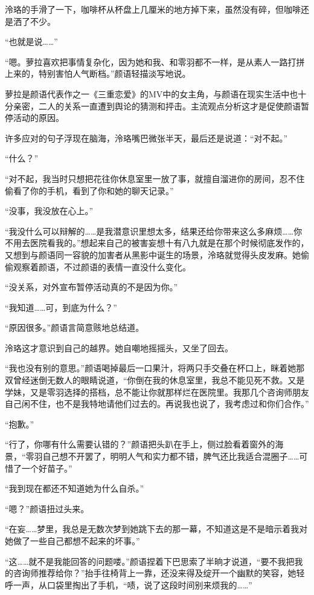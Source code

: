 \documentclass[UTF8, scheme = chinese, openany]{ctexbook}
\begin{document}
泠珞的手滑了一下，咖啡杯从杯盘上几厘米的地方掉下来，虽然没有碎，但咖啡还是洒了不少。

“也就是说……”

“嗯。萝拉喜欢把事情复杂化，因为她和我、和零羽都不一样，是从素人一路打拼上来的，特别害怕人气断档。”颜语轻描淡写地说。

萝拉是颜语代表作之一《三重恋爱》的MV中的女主角，与颜语在现实生活中也十分亲密，二人的关系一直遭到舆论的猜测和抨击。主流观点分析这才是促使颜语暂停活动的原因。

许多应对的句子浮现在脑海，泠珞嘴巴微张半天，最后还是说道：“对不起。”

“什么？”

“对不起，我当时只想把花往你休息室里一放了事，就擅自溜进你的房间，忍不住偷看了你的手机，看到了你和她的聊天记录。”

“没事，我没放在心上。”

“我没什么可以辩解的……是我潜意识里想太多，结果还给你带来这么多麻烦……你不用去医院看我的。”想起来自己的被害妄想十有八九就是在那个时候彻底发作的，又想到与颜语同一容貌的加害者从黑影中诞生的场景，泠珞就觉得头皮发麻。她偷偷观察着颜语，不过颜语的表情一直没什么变化。

“没关系，对外宣布暂停活动真的不是因为你。”

“我知道……可，到底为什么？”

“原因很多。”颜语言简意赅地总结道。

泠珞这才意识到自己的越界。她自嘲地摇摇头，又坐了回去。

“我也没有别的意思。”颜语喝掉最后一口果汁，将两只手交叠在杯口上，眯着她那双曾经迷倒无数人的眼睛说道，“你倒在我的休息室里，我总不能见死不救。又是学妹，又是零羽选择的搭档，总不能让你就那样烂在医院里。我那几个咨询师朋友自己闲不住，也不是我特地请他们过去的。再说我也说了，我考虑过和你们合作。”

“抱歉。”

“行了，你哪有什么需要认错的？”颜语把头趴在手上，侧过脸看着窗外的海景，“零羽自己想不开罢了，明明人气和实力都不错，脾气还比我适合混圈子……可惜了一个好苗子。”

“我到现在都还不知道她为什么自杀。”

“嗯？”颜语扭过头来。

“在妄……梦里，我总是无数次梦到她跳下去的那一幕，不知道这是不是暗示着我对她做了一些自己都想不起来的坏事。”

“这……就不是我能回答的问题喽。”颜语捏着下巴思索了半晌才说道，“要不我把我的咨询师推荐给你？”抬手往椅背上一靠，还没来得及绽开一个幽默的笑容，她轻呼一声，从口袋里掏出了手机，“啧，说了这段时间别来烦我的……”
\end{document}
